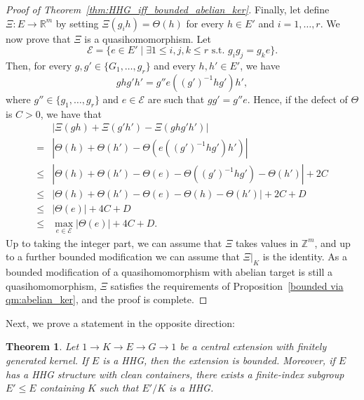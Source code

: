 \documentclass[svgnames]{amsart}
\theoremstyle{plain}
\newtheorem{thm}{Theorem}[section]
\theoremstyle{definition}
\newcommand{\cal}[1]{\mathcal{#1}}
\newcommand{\Z}{\mathbb{Z}}
\newcommand{\R}{\mathbb{R}}
\begin{document}
\begin{proof}[Proof of Theorem~\ref{thm:HHG_iff_bounded_abelian_ker}]
Finally, let define $\Xi\colon E\to \R^m$ by setting $\Xi(g_ih)=\Theta(h)$ for every $h\in E'$ and $i=1,\ldots,r$. We now prove that $\Xi$ is a quasihomomorphism. Let
$$\cal E=\{e\in E'\mid \exists 1\le i,j,k\le r\mbox{ s.t. }g_ig_j=g_k e\}.$$
Then, for every $g,g'\in \{G_1,\ldots, g_r\}$ and every $h,h'\in E'$, we have
$$ghg'h'=g''e((g')^{-1}hg')h',$$
where $g''\in \{g_1,\ldots,g_r\}$ and $e\in \cal E$ are such that $gg'=g''e$. Hence, if the defect of $\Theta$ is $C>0$, we have that
\begin{align*}
    &\left |\Xi(gh)+\Xi(g'h')-\Xi(ghg'h')\right|\\
    =&\left |\Theta(h)+\Theta(h')-\Theta(e((g')^{-1}hg')h')\right|\\
    \le&\left |\Theta(h)+\Theta(h')-\Theta(e)-\Theta((g')^{-1}hg')-\Theta(h')\right|+2C\\
    \le&\left |\Theta(h)+\Theta(h')-\Theta(e)-\Theta(h)-\Theta(h')\right|+2C+D\\
    \le&|\Theta(e)|+4C+D\\
    \le&\max_{e\in \cal E}|\Theta(e)|+4C+D.
\end{align*}
Up to taking the integer part, we can assume that $\Xi$ takes values in $\Z^m$, and up to a further bounded modification we can assume that $\Xi|_K$ is the identity. As a bounded modification of a quasihomomorphism with abelian target is still a quasihomomorphism, $\Xi$ satisfies the requirements of Proposition~\ref{bounded via qm:abelian_ker}, and the proof is complete.
\end{proof}

Next, we prove a statement in the opposite direction:

\begin{thm}\label{thm:centralquot_is_HHS}
    Let $1 \to K \to E \to G \to 1$ be a central extension with finitely generated kernel. If $E$ is a HHG, then the extension is bounded. Moreover, if $E$ has a HHG structure with clean containers, there exists a finite-index subgroup $E'\le E$ containing $K$ such that $E'/K$ is a HHG.
\end{thm}
\end{document}
